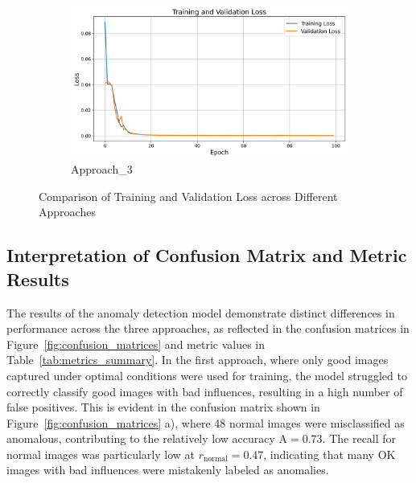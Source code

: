 \documentclass[12pt,DIV14,BCOR12mm,a4paper,footinclude=false,headinclude,parskip=half-,twoside,openright,cleardoublepage=empty,toc=index,bibliography=totoc,listof=totoc]{scrreprt}
\numberwithin{equation}{chapter}
\begin{document}
\begin{figure}
    \\ %
    \begin{subfigure}[b]{0.7\textwidth} %
        \centering
        \includegraphics[width=\textwidth]{../media/training_validation_loss_approach_3.PNG}
        \caption{Approach\_3}
        \label{fig:approach3}
    \end{subfigure}
    
    \caption{Comparison of Training and Validation Loss across Different Approaches}
    \label{fig:loss_plots}
\end{figure}


\subsection{Interpretation of Confusion Matrix and Metric Results}
\label{Confusion_matrix}

The results of the anomaly detection model demonstrate distinct differences in performance across the three approaches, as reflected in the confusion matrices in Figure~\ref{fig:confusion_matrices} and metric values in Table~\ref{tab:metrics_summary}. In the first approach, where only good images captured under optimal conditions were used for training, the model struggled to correctly classify good images with bad influences, resulting in a high number of false positives. This is evident in the confusion matrix shown in Figure~\ref{fig:confusion_matrices} a), where 48 normal images were misclassified as anomalous, contributing to the relatively low accuracy \( \text{A} = 0.73 \). The recall for normal images was particularly low at \( r_{\text{normal}} = 0.47 \), indicating that many OK images with bad influences were mistakenly labeled as anomalies.
\end{document}
